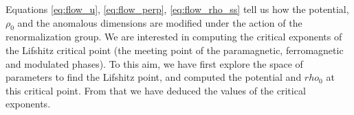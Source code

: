 Equations \ref{eq:flow_u}, \ref{eq:flow_perp}, \ref{eq:flow_rho_ss} tell us how the potential, $\rho_0$ and the anomalous dimensions are modified under the action of the renormalization group. We are interested in computing the critical exponents of the Lifshitz critical point (the meeting point of the paramagnetic, ferromagnetic and modulated phases). 
To this aim, we have first explore the space of parameters to find the Lifshitz point, and computed the potential and $rho_0$  at this critical point. From that we have deduced the values of the critical exponents.